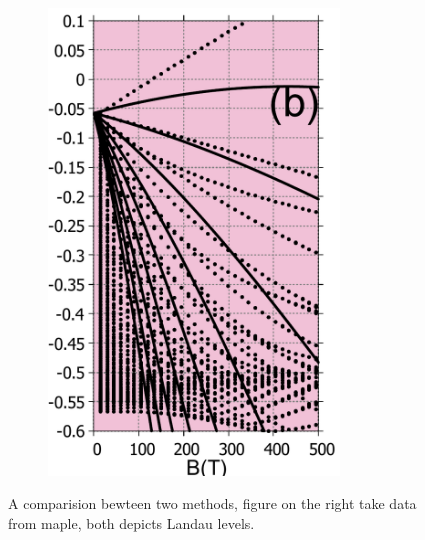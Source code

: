 \documentclass{report}
\begin{document}
\begin{figure}[htb]
\begin{subfigure}[b]{0.49\textwidth}
		\includegraphics[width=0.85\textwidth,height=1.2\linewidth]{pic/landaulevel_3band_q_797_EF_analytics_solution.pdf}
	\end{subfigure}
	\caption{
		A comparision bewteen two methods, figure on the right take data from maple, both depicts Landau levels.
	}
\end{figure}
\end{document}
